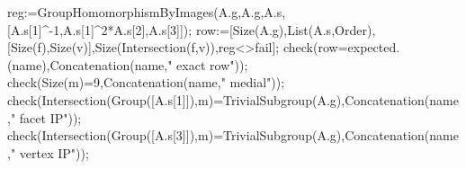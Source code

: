 \documentclass[
  10pt,
  letterpaper,
]{article}
\newenvironment{Shaded}{}{}
\newcommand{\BuiltInTok}[1]{\textcolor[rgb]{0.00,0.50,0.00}{#1}}
\newcommand{\ConstantTok}[1]{\textcolor[rgb]{0.53,0.00,0.00}{#1}}
\newcommand{\FloatTok}[1]{\textcolor[rgb]{0.25,0.63,0.44}{#1}}
\newcommand{\NormalTok}[1]{#1}
\newcommand{\OperatorTok}[1]{\textcolor[rgb]{0.40,0.40,0.40}{#1}}
\newcommand{\StringTok}[1]{\textcolor[rgb]{0.25,0.44,0.63}{#1}}
\newcommand{\VariableTok}[1]{\textcolor[rgb]{0.10,0.09,0.49}{#1}}
\begin{document}
\begin{Shaded}
\begin{Highlighting}[]
 \VariableTok{reg}\OperatorTok{:=}\BuiltInTok{GroupHomomorphismByImages}\NormalTok{(}\VariableTok{A}\NormalTok{.}\VariableTok{g}\OperatorTok{,}\VariableTok{A}\NormalTok{.}\VariableTok{g}\OperatorTok{,}\VariableTok{A}\NormalTok{.}\VariableTok{s}\OperatorTok{,}\NormalTok{[}\VariableTok{A}\NormalTok{.}\VariableTok{s}\NormalTok{[}\FloatTok{1}\NormalTok{]}\OperatorTok{\^{}{-}}\FloatTok{1}\OperatorTok{,}\VariableTok{A}\NormalTok{.}\VariableTok{s}\NormalTok{[}\FloatTok{1}\NormalTok{]}\OperatorTok{\^{}}\FloatTok{2}\OperatorTok{*}\VariableTok{A}\NormalTok{.}\VariableTok{s}\NormalTok{[}\FloatTok{2}\NormalTok{]}\OperatorTok{,}\VariableTok{A}\NormalTok{.}\VariableTok{s}\NormalTok{[}\FloatTok{3}\NormalTok{]])}\OperatorTok{;}
 \VariableTok{row}\OperatorTok{:=}\NormalTok{[}\BuiltInTok{Size}\NormalTok{(}\VariableTok{A}\NormalTok{.}\VariableTok{g}\NormalTok{)}\OperatorTok{,}\BuiltInTok{List}\NormalTok{(}\VariableTok{A}\NormalTok{.}\VariableTok{s}\OperatorTok{,}\BuiltInTok{Order}\NormalTok{)}\OperatorTok{,}\NormalTok{[}\BuiltInTok{Size}\NormalTok{(}\VariableTok{f}\NormalTok{)}\OperatorTok{,}\BuiltInTok{Size}\NormalTok{(}\VariableTok{v}\NormalTok{)]}\OperatorTok{,}\BuiltInTok{Size}\NormalTok{(}\BuiltInTok{Intersection}\NormalTok{(}\VariableTok{f}\OperatorTok{,}\VariableTok{v}\NormalTok{))}\OperatorTok{,}\VariableTok{reg}\OperatorTok{\textless{}\textgreater{}}\ConstantTok{fail}\NormalTok{]}\OperatorTok{;}
 \VariableTok{check}\NormalTok{(}\VariableTok{row}\OperatorTok{=}\VariableTok{expected}\NormalTok{.(}\VariableTok{name}\NormalTok{)}\OperatorTok{,}\BuiltInTok{Concatenation}\NormalTok{(}\VariableTok{name}\OperatorTok{,}\StringTok{" exact row"}\NormalTok{))}\OperatorTok{;}
 \VariableTok{check}\NormalTok{(}\BuiltInTok{Size}\NormalTok{(}\VariableTok{m}\NormalTok{)}\OperatorTok{=}\FloatTok{9}\OperatorTok{,}\BuiltInTok{Concatenation}\NormalTok{(}\VariableTok{name}\OperatorTok{,}\StringTok{" medial"}\NormalTok{))}\OperatorTok{;}
 \VariableTok{check}\NormalTok{(}\BuiltInTok{Intersection}\NormalTok{(}\BuiltInTok{Group}\NormalTok{([}\VariableTok{A}\NormalTok{.}\VariableTok{s}\NormalTok{[}\FloatTok{1}\NormalTok{]])}\OperatorTok{,}\VariableTok{m}\NormalTok{)}\OperatorTok{=}\BuiltInTok{TrivialSubgroup}\NormalTok{(}\VariableTok{A}\NormalTok{.}\VariableTok{g}\NormalTok{)}\OperatorTok{,}\BuiltInTok{Concatenation}\NormalTok{(}\VariableTok{name}\OperatorTok{,}\StringTok{" facet IP"}\NormalTok{))}\OperatorTok{;}
 \VariableTok{check}\NormalTok{(}\BuiltInTok{Intersection}\NormalTok{(}\BuiltInTok{Group}\NormalTok{([}\VariableTok{A}\NormalTok{.}\VariableTok{s}\NormalTok{[}\FloatTok{3}\NormalTok{]])}\OperatorTok{,}\VariableTok{m}\NormalTok{)}\OperatorTok{=}\BuiltInTok{TrivialSubgroup}\NormalTok{(}\VariableTok{A}\NormalTok{.}\VariableTok{g}\NormalTok{)}\OperatorTok{,}\BuiltInTok{Concatenation}\NormalTok{(}\VariableTok{name}\OperatorTok{,}\StringTok{" vertex IP"}\NormalTok{))}\OperatorTok{;}

\end{Highlighting}
\end{Shaded}
\end{document}
